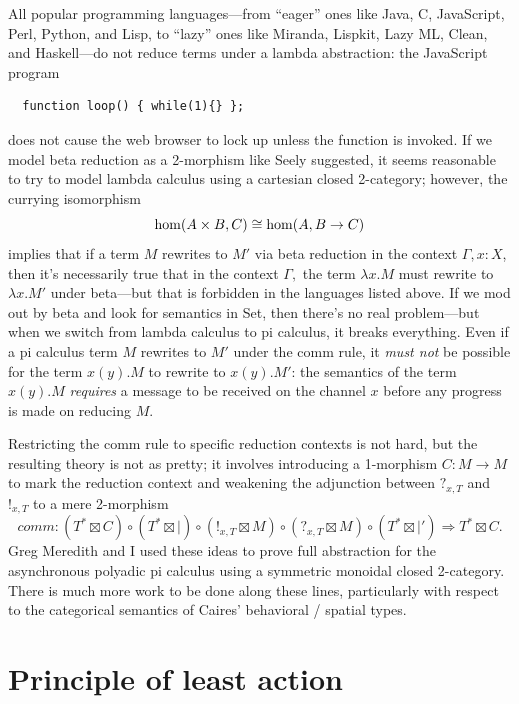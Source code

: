\documentclass[12pt,twoside,openright]{report}
\newcommand{\maps}{\colon}
\renewcommand{\hom}{{\rm hom}}
\begin{document}
All popular programming languages---from ``eager'' ones like Java, C, JavaScript, Perl, Python, and Lisp, to ``lazy'' ones like Miranda, Lispkit, Lazy ML, Clean, and Haskell---do not reduce terms under a lambda abstraction: the JavaScript program
\begin{verbatim}
  function loop() { while(1){} };
\end{verbatim}
does not cause the web browser to lock up unless the function is invoked.  If we model beta reduction as a 2-morphism like Seely suggested, it seems reasonable to try to model lambda calculus using a cartesian closed 2-category; however, the currying isomorphism
\[ \hom(A\times B, C) \cong \hom(A, B \to C) \]
implies that if a term $M$ rewrites to $M'$ via beta reduction in the context $\Gamma, x: X$, then it's necessarily true that in the context $\Gamma,$ the term $\lambda x.M$ must rewrite to $\lambda x.M'$ under beta---but that is forbidden in the languages listed above.  If we mod out by beta and look for semantics in Set, then there's no real problem---but when we switch from lambda calculus to pi calculus, it breaks everything.  Even if a pi calculus term $M$ rewrites to $M'$ under the comm rule, it {\em must not} be possible for the term $x(y).M$ to rewrite to $x(y).M'$: the semantics of the term $x(y).M$ {\em requires} a message to be received on the channel $x$ before any progress is made on reducing $M$.

Restricting the comm rule to specific reduction contexts is not hard, but the resulting theory is not as pretty; it involves introducing a 1-morphism $C\maps M \to M$ to mark the reduction context and weakening the adjunction between $?_{x, T}$ and $!_{x, T}$ to a mere 2-morphism 
\[ comm\maps (T^* \boxtimes C) \circ (T^* \boxtimes |) \circ (!_{x, T} \boxtimes M) \circ (?_{x, T} \boxtimes M) \circ (T^* \boxtimes |') \Rightarrow T^* \boxtimes C.\]  Greg Meredith and I \cite{AC} used these ideas to prove full abstraction for the asynchronous polyadic pi calculus using a symmetric monoidal closed 2-category.  There is much more work to be done along these lines, particularly with respect to the categorical semantics of Caires' behavioral / spatial types.

\section*{Principle of least action}
\end{document}
